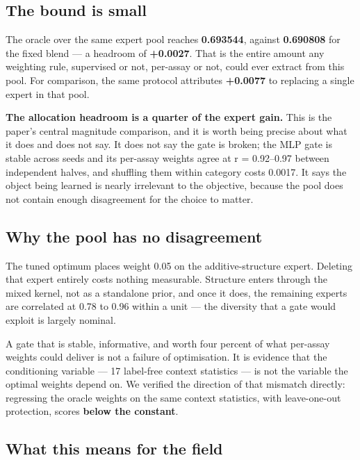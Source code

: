 \documentclass[sigconf,review,nonacm]{acmart}
\begin{document}
\subsection{The bound is small}\label{the-bound-is-small}

The oracle over the same expert pool reaches \textbf{0.693544}, against \textbf{0.690808} for the fixed blend --- a
headroom of \textbf{+0.0027}. That is the entire amount any weighting rule, supervised or not, per-assay or
not, could ever extract from this pool. For comparison, the same protocol attributes \textbf{+0.0077} to
replacing a single expert in that pool.

\textbf{The allocation headroom is a quarter of the expert gain.} This is the paper's central magnitude
comparison, and it is worth being precise about what it does and does not say. It does not say the gate
is broken; the MLP gate is stable across seeds and its per-assay weights agree at r = 0.92--0.97 between
independent halves, and shuffling them within category costs 0.0017. It says the object being learned
is nearly irrelevant to the objective, because the pool does not contain enough disagreement for the
choice to matter.

\subsection{Why the pool has no disagreement}\label{why-the-pool-has-no-disagreement}

The tuned optimum places weight 0.05 on the additive-structure expert. Deleting that expert entirely
costs nothing measurable. Structure enters through the mixed kernel, not as a standalone prior, and once
it does, the remaining experts are correlated at 0.78 to 0.96 within a unit --- the diversity that a gate
would exploit is largely nominal.

A gate that is stable, informative, and worth four percent of what per-assay weights could deliver is
not a failure of optimisation. It is evidence that the conditioning variable --- 17 label-free context
statistics --- is not the variable the optimal weights depend on. We verified the direction of that
mismatch directly: regressing the oracle weights on the same context statistics, with leave-one-out
protection, scores \textbf{below the constant}.

\subsection{What this means for the field}\label{what-this-means-for-the-field}
\end{document}
